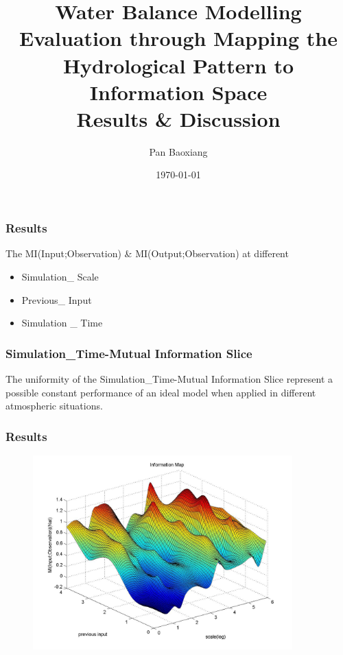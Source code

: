 \documentclass{beamer}
\begin{document}
\title{Water Balance Modelling Evaluation through Mapping the Hydrological Pattern to Information Space\\
\raggedleft Results \& Discussion}
\date{\today}
\author {Pan Baoxiang}
\maketitle 

\begin{frame}
\frametitle{Results}
The MI(Input;Observation) \& MI(Output;Observation) at different 
\begin{itemize}
\item Simulation\_ Scale
\item Previous\_ Input
\item Simulation \_ Time
\end{itemize} 
\end{frame}


\begin{frame}
\frametitle{Simulation\_{Time}-Mutual Information Slice}
The uniformity of the Simulation\_{Time}-Mutual Information Slice represent a possible constant performance of an ideal model when applied in different atmospheric situations.
\end{frame}

\begin{frame}
\frametitle{Results}
\begin{figure}[htbp]
\centering
\includegraphics[width=10cm]{1.jpg}
\end{figure}
\end{frame}
\end{document}
